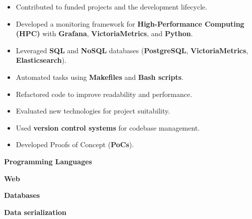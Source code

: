 \documentclass[10pt,a4paper,ragged2e,withhyper]{altacv}
\begin{document}
\begin{paracol}{2}
      \begin{itemize}
            \item Contributed to funded projects and the development lifecycle.
            \item Developed a monitoring framework for \textbf{High-Performance Computing (HPC)}
                  with \textbf{Grafana}, \textbf{VictoriaMetrics}, and \textbf{Python}.
            \item Leveraged \textbf{SQL} and \textbf{NoSQL} databases (\textbf{PostgreSQL},
                  \textbf{VictoriaMetrics}, \textbf{Elasticsearch}).
            \item Automated tasks using \textbf{Makefiles} and \textbf{Bash scripts}.
            \item Refactored code to improve readability and performance.
            \item Evaluated new technologies for project suitability.
            \item Used \textbf{version control systems} for codebase management.
            \item Developed Proofs of Concept (\textbf{PoCs}).
      \end{itemize}

      \switchcolumn


      \textbf{Programming Languages}
      \newline \medbreak
      \newline \medbreak

      \textbf{Web}
      \newline \medbreak
      \\ \smallbreak
      \newline \medbreak

      \textbf{Databases}
      \newline \medbreak
       \\ \smallbreak
      \newline \medbreak

      \textbf{Data serialization}
      \newline \medbreak
      \\ \smallbreak
      \newline \medbreak


\end{paracol}
\end{document}
